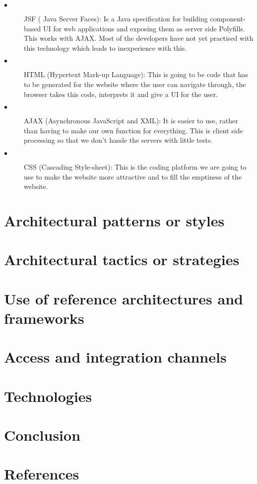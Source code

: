 \documentclass[12pt]{article}
\begin{document}
\begin{description}
  \item[$\bullet$] JSF ( Java Server Faces):
  Is a Java specification for building component-based UI for web applications and exposing them as server side Polyfills. This works with AJAX. Most of the developers have not yet practised with this technology which leads to inexperience with this. 
  
  \item[$\bullet$] HTML (Hypertext Mark-up Language):
  This is going to be code that has to be generated for the website where the user can navigate through, the browser takes this code, interprets it and give a UI for the user. 
  
  \item[$\bullet$] AJAX (Asynchronous JavaScript and XML):
  It is easier to use, rather than having to make our own function for everything. This is client side processing so that we don’t hassle the servers with little tests.
  
  \item[$\bullet$] CSS (Cascading Style-sheet):
  This is the coding platform we are going to use to make the website more attractive and to fill the emptiness of the website.
\end{description}

\section{Architectural patterns or styles}

\section{Architectural tactics or strategies}

\section{Use of reference architectures and frameworks}

\section{Access and integration channels}

\section{Technologies}

\section{Conclusion}

\section{References}
\end{document}
